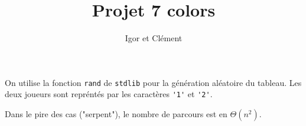 \documentclass[12pt,L,fira-sans]{paper}
\title{Projet 7 colors}
\author{Igor \maj{Martayan} et Clément \maj{Morrand}}
\begin{document}
\maketitle

\begin{qu}
	On utilise la fonction \verb|rand| de \verb|stdlib| pour la génération aléatoire du tableau.
	Les deux joueurs sont repréntés par les caractères \verb|'1'| et \verb|'2'|.
\end{qu}

\begin{qu}
	Dans le pire des cas ("serpent"), le nombre de parcours est en \(\Theta(n^2)\).
\end{qu}
\end{document}
